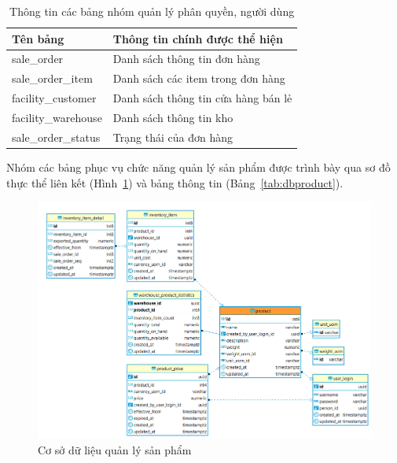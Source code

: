 \begin{table}[H]
\centering
\begin{tabular}{| m{5cm} | m{10cm} |}
\hline
\textbf{Tên bảng} & \textbf{Thông tin chính được thể hiện} \\
\hline
sale\_order &
Danh sách thông tin đơn hàng \\
\hline
sale\_order\_item &
Danh sách các item trong đơn hàng \\
\hline
facility\_customer &
Danh sách thông tin cửa hàng bán lẻ \\
\hline
facility\_warehouse &
Danh sách thông tin kho  \\
\hline
sale\_order\_status &
Trạng thái của đơn hàng \\
\hline
\end{tabular}
\caption{Thông tin các bảng nhóm quản lý phân quyền, người dùng}
\label{tab:dborder}
\end{table}

Nhóm các bảng phục vụ chức năng quản lý sản phẩm
được trình bày qua sơ đồ thực thể liên kết (Hình~\ref{fig:dbproduct})
và bảng thông tin (Bảng~\ref{tab:dbproduct}).
\begin{figure}[H]
\centering
\includegraphics[width=17cm]{images/database/product.png}
\caption{Cơ sở dữ liệu quản lý sản phẩm}
\label{fig:dbproduct}
\end{figure}

